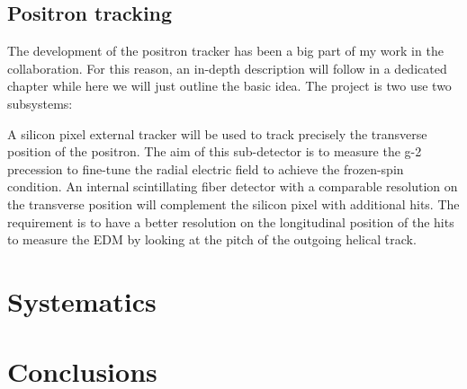 \begin{refsection}
    \subsection{Positron tracking}
        The development of the positron tracker has been a big part of my work in the collaboration.
        For this reason, an in-depth description will follow in a dedicated chapter while here we will just outline the basic idea.
        The project is two use two subsystems:
        \begin{outline}
            \1 A silicon pixel external tracker will be used to track precisely the transverse position of the positron. The aim of this sub-detector is to measure the g-2 precession to fine-tune the radial electric field to achieve the frozen-spin condition.
            \1 An internal scintillating fiber detector with a comparable resolution on the transverse position will complement the silicon pixel with additional hits. The requirement is to have a better resolution on the longitudinal position of the hits to measure the EDM by looking at the pitch of the outgoing helical track.
        \end{outline}

\section{Systematics}
\label{muEDM:systematics}


\cite{muEDM:Semertzidis:2001} \cite{muEDM:g-2:2008} \cite{muEDM:Adelmann:2010} \cite{muEDM:J-PARC:2011} \cite{muEDM:J-PARC:2016} \cite{muEDM:PSI:2021} \cite{muEDM:PSI:Mikio:2022} \cite{muEDM:PSI:Kim:2022}

\section{Conclusions}

\printbibliography[
    heading = bibliographychapter,
    title=Bibliography on muEDM
]

\end{refsection}

